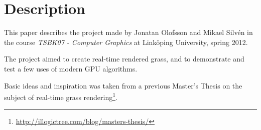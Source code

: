 \section{Description}
\label{cha:description}
This paper describes the project made by Jonatan Olofsson and Mikael Silvén
in the course \textit{TSBK07 - Computer Graphics} at Linköping University, spring 2012.

The project aimed to create real-time rendered grass, and to demonstrate
and test a few uses of modern GPU algorithms.

Basic ideas and inspiration was taken from a previous Master's Thesis on the
subject of real-time grass rendering\footnote{\url{http://illogictree.com/blog/masters-thesis/}}.
